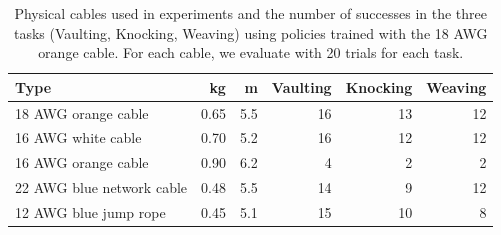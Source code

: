 \begin{table}[t]
    \vspace*{4pt}
    \centering
    \caption{Physical cables used in experiments and the number of successes in the three tasks (Vaulting, Knocking, Weaving) using policies trained with the 18 AWG orange cable. For each cable, we evaluate with 20 trials for each task.}
    \begin{tabular}{@{}l@{\quad}r@{\quad}r@{\quad}r@{\quad}r@{\quad}r@{}}\toprule
        
         Type & kg & m & Vaulting & Knocking & Weaving \\
        \midrule
         18 AWG orange cable  & 0.65 & 5.5 & 16&13&12\\
         16 AWG white cable   & 0.70 & 5.2 &16&12&12\\
         16 AWG orange cable  & 0.90 & 6.2 &4&2&2\\
         22 AWG blue network cable  & 0.48 & 5.5 &14&9&12\\
         12 AWG blue jump rope   & 0.45 & 5.1 &15&10&8\\
         \bottomrule
    \end{tabular}
    \vspace*{-16pt}
    \label{tab:cable_types}
\end{table}